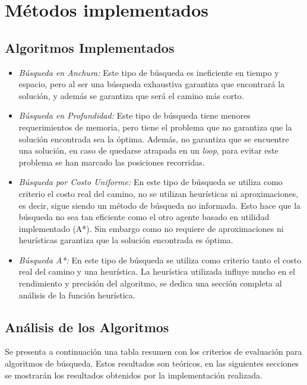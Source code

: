 \documentclass[letter, titlepage, 10pt]{article}
\begin{document}
\newpage

\section{Métodos implementados}

\subsection{Algoritmos Implementados}
    \begin{itemize}
      \item{\textit{Búsqueda en Anchura: }} Este tipo de búsqueda es ineficiente en tiempo y espacio, pero al ser una búsqueda exhaustiva garantiza que encontrará la solución, y además se garantiza que será el camino más corto.
      \item{\textit{Búsqueda en Profundidad: }} Este tipo de búsqueda tiene menores requerimientos de memoria, pero tiene el problema que no garantiza que la solución encontrada sea la óptima. Además, no garantiza que se encuentre una solución, en caso de quedarse atrapada en un \textit{loop}, para evitar este problema se han marcado las posiciones recorridas.  
      \item{\textit{Búsqueda por Costo Uniforme: }} En este tipo de búsqueda se utiliza como criterio el costo real del camino, no se utilizan heurísticas ni aproximaciones, es decir, sigue siendo un método de búsqueda no informada. Esto hace que la búsqueda no sea tan eficiente como el otro agente basado en utilidad implementado (A*). Sin embargo como no requiere de aproximaciones ni heurísticas garantiza que la solución encontrada es óptima. 
      \item{\textit{Búsqueda A*: }}  En este tipo de búsqueda se utiliza como criterio tanto el costo real del camino y una heurística. La heurística utilizada influye mucho en el rendimiento y precisión del algoritmo, se dedica una sección completa al análisis de la función heurística.
    \end{itemize}       

\subsection{Análisis de los Algoritmos}
Se presenta a continuación una tabla resumen con los criterios de evaluación para algoritmos de búsqueda. Estos resultados son teóricos, en las siguientes secciones se mostrarán los resultados obtenidos por la implementación realizada.
\end{document}
